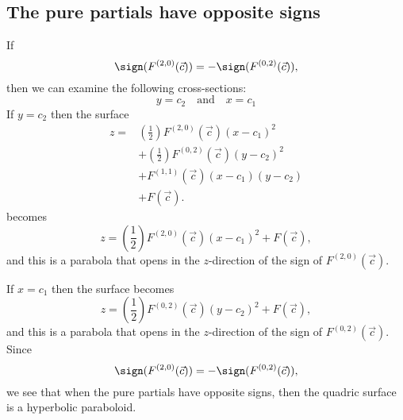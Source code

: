 \documentclass{ximera}
\begin{document}
\subsection{The pure partials have opposite signs}
If
\[
\sign(F^{(2,0)}(\vec{c})) = -\sign(F^{(0,2)}(\vec{c})),
\]
then we can examine the following cross-sections:
\[
y= c_2 \quad\text{and}\quad x = c_1
\]
If $y=c_2$ then the surface
\begin{align*}
  z = &\left(\frac{1}{2}\right)F^{(2,0)}(\vec{c})(x-c_1)^2\\
  &+ \left(\frac{1}{2}\right)F^{(0,2)}(\vec{c})(y-c_2)^2 \\
  &+ F^{(1,1)}(\vec{c}) (x-c_1)(y-c_2)\\
  &+ F(\vec{c}).
\end{align*}
becomes
\[
z = \left(\frac{1}{2}\right)F^{(2,0)}(\vec{c})(x-c_1)^2 + F(\vec{c}),
\]
and this is a parabola that opens in the $z$-direction of the sign of
$F^{(2,0)}(\vec{c})$.

If $x=c_1$ then the surface becomes
\[
z = \left(\frac{1}{2}\right)F^{(0,2)}(\vec{c})(y-c_2)^2 + F(\vec{c}),
\]
and this is a parabola that opens in the $z$-direction of the sign of
$F^{(0,2)}(\vec{c})$. Since 
\[
\sign(F^{(2,0)}(\vec{c})) = -\sign(F^{(0,2)}(\vec{c})),
\]
we see that when the pure partials have opposite signs, then the
quadric surface is a hyperbolic paraboloid.
\end{document}
